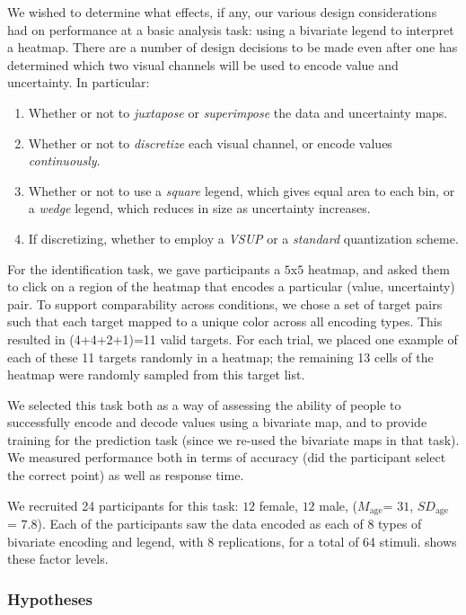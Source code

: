 We wished to determine what effects, if any, our various design considerations had on performance at a basic analysis task: using a bivariate legend to interpret a heatmap. There are a number of design decisions to be made even after one has determined which two visual channels will be used to encode value and uncertainty.
In particular:
\begin{enumerate}
	\item Whether or not to \emph{juxtapose} or \emph{superimpose} the data and uncertainty maps.
	\item Whether or not to \emph{discretize} each visual channel, or encode values \emph{continuously}.
	\item Whether or not to use a \emph{square} legend, which gives equal area to each bin, or a \emph{wedge} legend, which reduces in size as uncertainty increases.
	\item If discretizing, whether to employ a \emph{VSUP} or a \emph{standard} quantization scheme.
\end{enumerate}

For the identification task, we gave participants a $5$x$5$ heatmap, and asked them to click on a region of the heatmap that encodes a particular (value, uncertainty) pair. To support comparability across conditions, we chose a set of target pairs such that each target mapped to a unique color across all encoding types. This resulted in (4+4+2+1)=11 valid targets. For each trial, we placed one example of each of these 11 targets randomly in a heatmap; the remaining 13 cells of the heatmap were randomly sampled from this target list.

We selected this task both as a way of assessing the ability of people to successfully encode and decode values using a bivariate map, and to provide training for the prediction task (since we re-used the bivariate maps in that task). We measured performance both in terms of accuracy (did the participant select the correct point) as well as response time.

We recruited 24 participants for this task: $12$ female, $12$ male, ($M_{\text{age}}$= $31$, $SD_{\text{age}}$ = $7.8$). Each of the participants saw the data encoded as each of 8 types of bivariate encoding and legend, with 8 replications, for a total of 64 stimuli.  shows these factor levels.

\subsubsection{Hypotheses}

